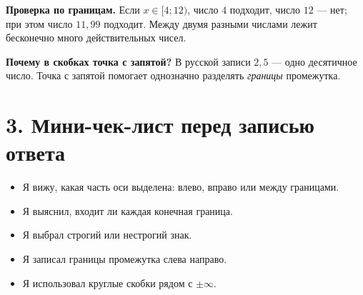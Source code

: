 \documentclass[a4paper,12pt]{article}
\newcommand{\headingrule}{\vspace{-0.5em}{\color{accent}\hrule height 0.55pt}\vspace{0.5em}}
\newcommand{\key}[1]{\textbf{\color{darkaccent}#1}}
\begin{document}
\key{Проверка по границам.} Если $x\in[4;12)$, число $4$ подходит, число $12$ --- нет; при этом число $11{,}99$ подходит. Между двумя разными числами лежит бесконечно много действительных чисел.

\key{Почему в скобках точка с запятой?} В русской записи $2{,}5$ --- одно десятичное число. Точка с запятой помогает однозначно разделять \emph{границы} промежутка.

\section*{3. Мини-чек-лист перед записью ответа}
\headingrule
\begin{itemize}
\item[$\square$] Я вижу, какая часть оси выделена: влево, вправо или между границами.
\item[$\square$] Я выяснил, входит ли каждая конечная граница.
\item[$\square$] Я выбрал строгий или нестрогий знак.
\item[$\square$] Я записал границы промежутка слева направо.
\item[$\square$] Я использовал круглые скобки рядом с $\pm\infty$.
\end{itemize}
\clearpage
\end{document}

